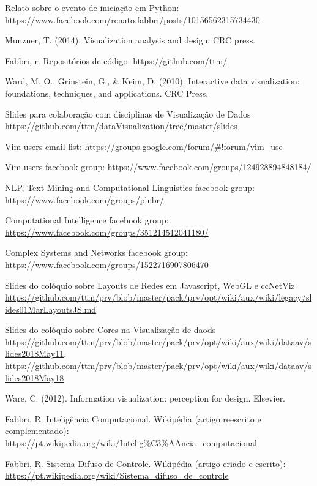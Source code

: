 \documentclass[a4paper, 11pt]{article}
\begin{document}
\begin{thebibliography}{99}
  Relato sobre o evento de iniciação em Python: \url{https://www.facebook.com/renato.fabbri/posts/10156562315734430}

	Munzner, T. (2014). Visualization analysis and design. CRC press.

  Fabbri, r. Repositórios de código: \url{https://github.com/ttm/}

	Ward, M. O., Grinstein, G., \& Keim, D. (2010). Interactive data visualization: foundations, techniques, and applications. CRC Press.

  Slides para colaboração com disciplinas de Visualização de Dados \url{https://github.com/ttm/dataVisualization/tree/master/slides}

  Vim users email list: \url{https://groups.google.com/forum/#!forum/vim_use}

  Vim users facebook group: \url{https://www.facebook.com/groups/124928894848184/}

  NLP, Text Mining and Computational Linguistics facebook group: \url{https://www.facebook.com/groups/plnbr/}

  Computational Intelligence facebook group: \url{https://www.facebook.com/groups/351214512041180/}

  Complex Systems and Networks facebook group: \url{https://www.facebook.com/groups/1522716907806470}

  Slides do colóquio sobre Layouts de Redes em Javascript, WebGL e ccNetViz \url{https://github.com/ttm/prv/blob/master/pack/prv/opt/wiki/aux/wiki/legacy/slides01MarLayoutsJS.md}

  Slides do colóquio sobre Cores na Visualização de daods \url{https://github.com/ttm/prv/blob/master/pack/prv/opt/wiki/aux/wiki/dataav/slides2018May11}, \url{https://github.com/ttm/prv/blob/master/pack/prv/opt/wiki/aux/wiki/dataav/slides2018May18}

  Ware, C. (2012). Information visualization: perception for design. Elsevier.

  Fabbri, R. Inteligência Computacional. Wikipédia (artigo reescrito e complementado): \url{https://pt.wikipedia.org/wiki/Intelig%C3%AAncia_computacional}

  Fabbri, R. Sistema Difuso de Controle. Wikipédia (artigo criado e escrito): \url{https://pt.wikipedia.org/wiki/Sistema_difuso_de_controle}


\end{thebibliography}
\end{document}
